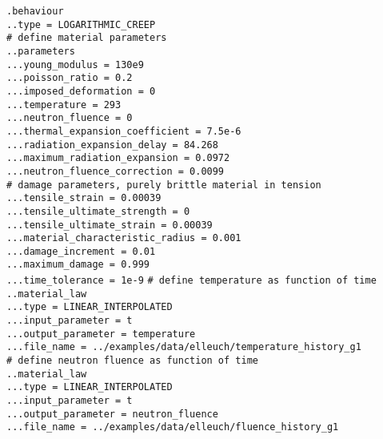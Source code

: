 \documentclass[10pt]{article}
\begin{document}
\noindent \verb+.behaviour+\\
\verb+..type = LOGARITHMIC_CREEP+\\
\verb+# define material parameters+\\
\verb+..parameters+\\
\verb+...young_modulus = 130e9+\\
\verb+...poisson_ratio = 0.2+\\
\verb+...imposed_deformation = 0+\\
\verb+...temperature = 293+\\
\verb+...neutron_fluence = 0+\\
\verb+...thermal_expansion_coefficient = 7.5e-6+\\
\verb+...radiation_expansion_delay = 84.268+\\
\verb+...maximum_radiation_expansion = 0.0972+\\
\verb+...neutron_fluence_correction = 0.0099+\\
\verb+# damage parameters, purely brittle material in tension+\\
\verb+...tensile_strain = 0.00039+\\
\verb+...tensile_ultimate_strength = 0+\\
\verb+...tensile_ultimate_strain = 0.00039+\\
\verb+...material_characteristic_radius = 0.001+\\
\verb+...damage_increment = 0.01+\\
\verb+...maximum_damage = 0.999+\\
\verb+...time_tolerance = 1e-9+
\verb+# define temperature as function of time+\\
\verb+..material_law+\\
\verb+...type = LINEAR_INTERPOLATED+\\
\verb+...input_parameter = t+\\
\verb+...output_parameter = temperature+\\
\verb+...file_name = ../examples/data/elleuch/temperature_history_g1+\\
\verb+# define neutron fluence as function of time+\\
\verb+..material_law+\\
\verb+...type = LINEAR_INTERPOLATED+\\
\verb+...input_parameter = t+\\
\verb+...output_parameter = neutron_fluence+\\
\verb+...file_name = ../examples/data/elleuch/fluence_history_g1+\\
\end{document}
